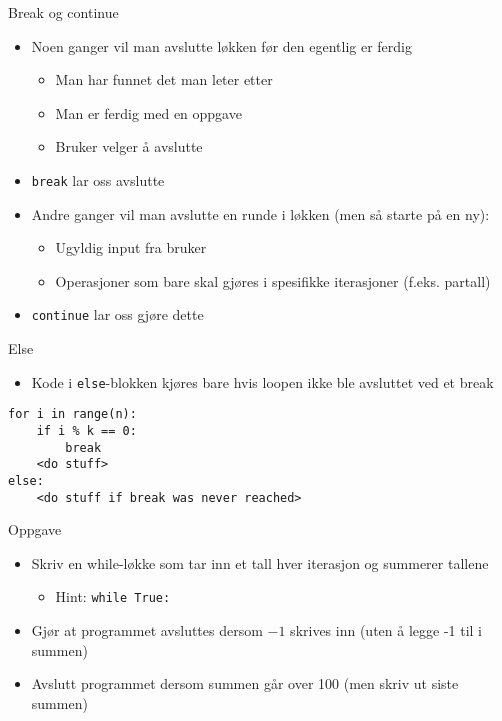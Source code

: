 \documentclass[screen, aspectratio=169]{beamer}
\begin{document}
\begin{frame}[fragile]{Break og continue}
	\begin{itemize}
		\item Noen ganger vil man avslutte løkken før den egentlig er ferdig
		\begin{itemize}
			\item Man har funnet det man leter etter
			\item Man er ferdig med en oppgave
			\item Bruker velger å avslutte
		\end{itemize}
		\item \lstinline|break| lar oss avslutte
		\item Andre ganger vil man avslutte en runde i løkken (men så starte på en ny):
		\begin{itemize}
			\item Ugyldig input fra bruker
			\item Operasjoner som bare skal gjøres i spesifikke iterasjoner (f.eks. partall)
		\end{itemize}
		\item \lstinline|continue| lar oss gjøre dette
	\end{itemize}
\end{frame}

\begin{frame}[fragile]{Else}
	\begin{itemize}
		\item Kode i \lstinline|else|-blokken kjøres bare hvis loopen ikke ble avsluttet ved et break
	\end{itemize}
	\begin{lstlisting}
for i in range(n):
	if i % k == 0:
		break
	<do stuff>
else:
	<do stuff if break was never reached>
	\end{lstlisting}
\end{frame}

\begin{frame}{Oppgave}
	\begin{itemize}
		\item<1-> Skriv en while-løkke som tar inn et tall hver iterasjon og summerer tallene
		\begin{itemize}
			\item Hint: \lstinline|while True:|
		\end{itemize}
		\item<2-> Gjør at programmet avsluttes dersom $-1$ skrives inn (uten å legge -1 til i summen)
		\item<3-> Avslutt programmet dersom summen går over 100 (men skriv ut siste summen)
	\end{itemize}
\end{frame}
\end{document}
